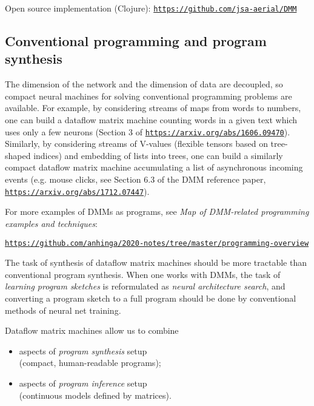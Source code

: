 \documentclass{article}
\begin{document}
Open source implementation (Clojure): \href{https://github.com/jsa-aerial/DMM}{\tt https://github.com/jsa-aerial/DMM}

\subsection{Conventional programming and program synthesis} The dimension of the network and the dimension
of data are decoupled, so compact neural machines for solving conventional programming problems are available.
For example, by considering streams of maps from words to numbers, one can build a dataflow matrix machine
counting words in a given text which uses only a few neurons 
(Section 3 of \href{https://arxiv.org/abs/1606.09470}{\tt https://arxiv.org/abs/1606.09470}).
Similarly, by considering streams of V-values  (flexible tensors based on tree-shaped indices) and embedding
of lists into trees, one can build a similarly compact dataflow matrix machine
accumulating a list of asynchronous incoming events
(e.g. mouse clicks, see Section 6.3 of the DMM reference paper, \href{https://arxiv.org/abs/1712.07447}{\tt https://arxiv.org/abs/1712.07447}). 

For more examples of DMMs as programs, see {\em Map of DMM-related programming examples and techniques}: 

\hspace{0.3in}\href{https://github.com/anhinga/2020-notes/tree/master/programming-overview}{\tt https://github.com/anhinga/2020-notes/tree/master/programming-overview}

\vspace{0.1in}

The task of synthesis of dataflow matrix machines
should be more tractable than conventional program synthesis. When one works with DMMs, the task of
{\em learning program sketches} is reformulated as {\em neural architecture search},
and converting a program sketch to a full program should be done by
conventional methods of neural net training. 

\vspace{0.1in}
\noindent
Dataflow matrix machines allow us  to combine

  \begin{itemize}
      \item aspects of {\em program synthesis} setup\\ (compact, human-readable programs);
      \item aspects of {\em program inference} setup\\ (continuous models defined by matrices).
  \end{itemize}
\end{document}
